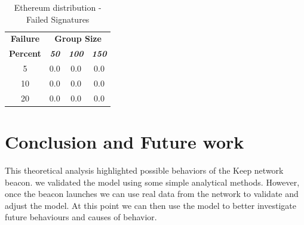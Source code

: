 \documentclass[conference]{IEEEtran}
\begin{document}
        \begin{table}[h!]
            \caption{Ethereum distribution - Failed Signatures}
            \begin{center}
            \begin{tabular}{|c|c|c|c|}
            \hline
            \textbf{Failure}&\multicolumn{3}{|c|}{\textbf{Group Size}} \\
            \cline{2-4} 
            \textbf{Percent} & \textbf{\textit{50}}& \textbf{\textit{100}}& \textbf{\textit{150}} \\
            \hline
            5 &  0.0 &  0.0 &  0.0 \\
            \hline
            10 &  0.0 &  0.0 &  0.0 \\
            \hline
            20 &  0.0 &  0.0 &  0.0 \\
            \hline
            \end{tabular}
            \label{failed_table2}
            \end{center}
        \end{table}


\section{Conclusion and Future work}
This theoretical analysis highlighted possible behaviors of the Keep network beacon. we
validated the model using some simple analytical methods. However, once the beacon launches
we can use real data from the network to validate and adjust the model. At this point we can
then use the model to better investigate future behaviours and causes of behavior. 


\newpage


\end{document}

